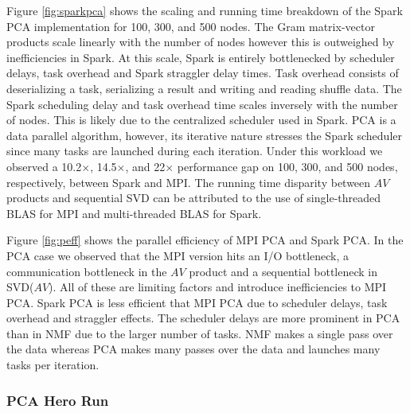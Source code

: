 Figure \ref{fig:sparkpca} shows the scaling and running time breakdown of the Spark PCA implementation for 100, 300, and 500 nodes. The Gram matrix-vector products scale linearly with the number of nodes however this is outweighed by inefficiencies in Spark. At this scale, Spark is entirely bottlenecked by scheduler delays, task overhead and Spark straggler delay times. Task overhead consists of deserializing a task, serializing a result and writing and reading shuffle data. The Spark scheduling delay and task overhead time scales inversely with the number of nodes. This is likely due to the centralized scheduler used in Spark. PCA is a data parallel algorithm, however, its iterative nature stresses the Spark scheduler since many tasks are launched during each iteration. Under this workload we observed a 10.2$\times$, 14.5$\times$, and 22$\times$ performance gap on 100, 300, and 500 nodes, respectively, between Spark and MPI. The running time disparity between $AV$ products and sequential SVD can be attributed to the use of single-threaded BLAS for MPI and multi-threaded BLAS for Spark.

Figure \ref{fig:peff} shows the parallel efficiency of MPI PCA and Spark PCA. In the PCA case we observed that the MPI version hits an I/O bottleneck, a communication bottleneck in the $AV$ product and a sequential bottleneck in SVD($AV$). All of these are limiting factors and introduce inefficiencies to MPI PCA. Spark PCA is less efficient that MPI PCA due to scheduler delays, task overhead and straggler effects. The scheduler delays are more prominent in PCA than in NMF due to the larger number of tasks. NMF makes a single pass over the data whereas PCA makes many passes over the data and launches many tasks per iteration.



\subsubsection{PCA Hero Run}

